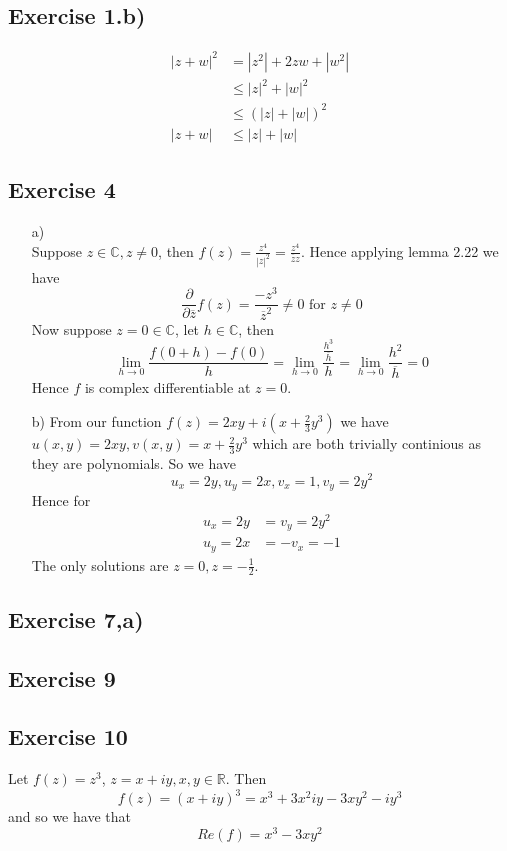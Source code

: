\documentclass[a4paper, 12pt, twoside]{article}
\author{jdRanda}
\begin{document}
\subsection*{Exercise 1.b)}
\begin{align*}
    |z+w|^{2} &= |z^{2}|+2zw+|w^{2}|\\
    &\leq |z|^{2}+|w|^{2}\\
    &\leq (|z|+|w|)^{2}\\
    |z+w| &\leq|z|+|w|
\end{align*}
\subsection*{Exercise 4}
\begin{itemize}
    \item[a)]  \\
    Suppose $z\in \mathbb{C}, z\neq0$, then $f(z)=\frac{z^{4}}{|z|^{2}}= \frac{z^{4}}{\overline{z}z}$. Hence applying lemma 2.22 we have
    $$\frac{\partial}{\partial\overline{z}}f(z)=\frac{-z^{3}}{\overline{z}^{2}}\neq 0\text{   for } z \neq 0$$
    Now suppose $z=0\in \mathbb{C}$, let $h\in \mathbb{C}$, then
    $$ \lim_{h\to0}\frac{f(0+h)-f(0)}{h}=\lim_{h\to0}\frac{\frac{h^{3}}{\overline{h}}}{h}= \lim_{h\to0}\frac{h^{2}}{\overline{h}}=0 $$
    Hence $f$ is complex differentiable at $z=0$.
    \item[b)]
    From our function $f(z)=2xy+i(x+\frac{2}{3}y^{3})$ we have $u(x,y)=2xy,v(x,y)= x+\frac{2}{3}y^{3}$ which are both trivially continious as they are polynomials. So we have
    $$u_{x}=2y,u_{y}=2x,v_{x}=1,v_y=2y^{2} $$
    Hence for
    \begin{align*}
        u_{x}=2y &= v_y=2y^{2}\\
        u_{y}=2x &= -v_{x}=-1
    \end{align*}
    The only solutions are $z=0,z=-\frac{1}{2}$.
\end{itemize}



\subsection*{Exercise 7,a)}



\subsection*{Exercise 9}



\subsection*{Exercise 10}
Let $f(z)=z^{3}$, $z=x+iy, x,y\in \mathbb{R}$. Then
$$ f(z)=(x+iy)^{3}=x^{3}+3x^{2}iy-3xy^{2}-iy^{3}$$
and so we have that
$$Re(f)= x^{3}-3xy^{2}$$
\end{document}
